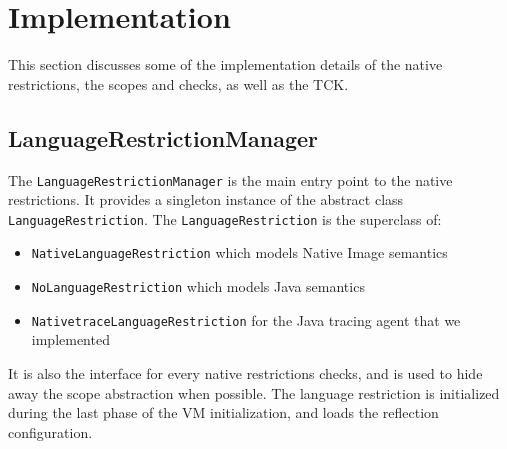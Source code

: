 


\chapter{Implementation}

This section discusses some of the implementation details of the native restrictions, the scopes and checks, as well as the TCK.

\section{LanguageRestrictionManager}
The \verb|LanguageRestrictionManager| is the main entry point to the native restrictions. It provides a singleton instance of the abstract class \verb|LanguageRestriction|.
The \verb|LanguageRestriction| is the superclass of: 
\begin{itemize}
    \item \texttt{NativeLanguageRestriction} which models Native Image semantics
    \item \texttt{NoLanguageRestriction} which  models Java semantics
    \item \texttt{NativetraceLanguageRestriction} for the Java tracing agent that we implemented
\end{itemize}

It is also the interface for every native restrictions checks, and is used to hide away the scope abstraction when possible.
The language restriction is initialized during the last phase of the VM initialization, and loads the reflection configuration.
